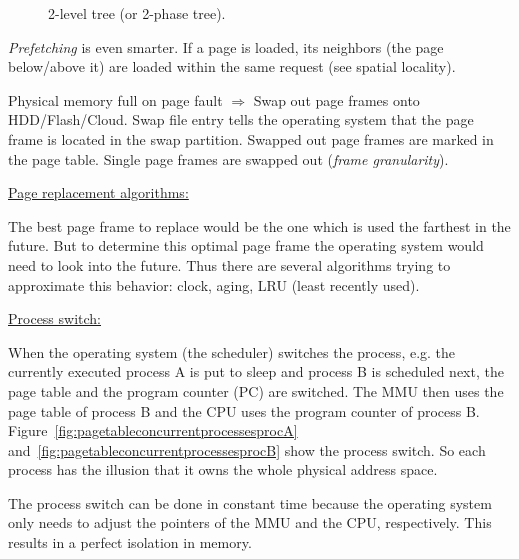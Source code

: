 {{\begin{figure}
			\caption{2-level tree (or 2-phase tree).}
			\label{fig:2leveltree}
		\end{figure}
		\par{\noindent\textit{Prefetching} is even smarter. If a page is loaded, its neighbors (the page below/above it) are loaded within the same request (see spatial locality).}
		\par{
			\noindent
			Physical memory full on page fault $\Rightarrow$ Swap out page frames onto HDD/Flash/Cloud. Swap file entry tells the operating system that the page frame is located in the swap partition. Swapped out page frames are marked in the page table. Single page frames are swapped out (\textit{frame granularity}).
		}
		\par{
			\noindent\underline{Page replacement algorithms:}
			\par{
				\noindent
				The best page frame to replace would be the one which is used the farthest in the future. But to determine this optimal page frame the operating system would need to look into the future. Thus there are several algorithms trying to approximate this behavior: clock, aging, LRU (least recently used).
			}
		}
		\par{
			\noindent\underline{Process switch:}
			\par{
				\noindent
				When the operating system (the scheduler) switches the process, e.g. the currently executed process A is put to sleep and process B is scheduled next, the page table and the program counter (PC) are switched. The MMU then uses the page table of process B and the CPU uses the program counter of process B. Figure~\ref{fig:pagetableconcurrentprocessesprocA} and~\ref{fig:pagetableconcurrentprocessesprocB} show the process switch. So each process has the illusion that it owns the whole physical address space.
			}
			\par{
				\noindent
				The process switch can be done in constant time because the operating system only needs to adjust the pointers of the MMU and the CPU, respectively. This results in a perfect isolation in memory.
			}
		}
		\clearpage
		\begin{figure}[H]
			\centering
\end{figure}}}
